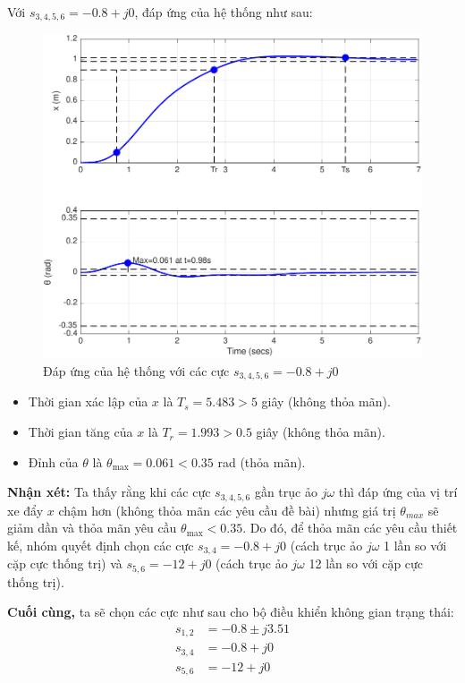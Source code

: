 \documentclass[12pt,a4paper]{article}
\begin{document}
\newpage

Với $s_{3,4,5,6}=-0.8+j0$, đáp ứng của hệ thống như sau:

\begin{figure}[ht]
    \centering
    \includegraphics[width=0.75\linewidth]{ss1.pdf}
    \caption{Đáp ứng của hệ thống với các cực $s_{3,4,5,6} = -0.8 +j0$}
\end{figure}

\begin{itemize}
    \item Thời gian xác lập của $x$ là $T_s = 5.483 > 5$ giây (không thỏa mãn).
    \item Thời gian tăng của $x$ là $T_r = 1.993 > 0.5$ giây (không thỏa mãn).
    \item Đỉnh của $\theta$ là $\theta_{\max} = 0.061 < 0.35$ rad (thỏa mãn).
\end{itemize}

\textbf{Nhận xét:} Ta thấy rằng khi các cực $s_{3,4,5,6}$ gần trục ảo $j\omega$ thì đáp ứng của vị trí xe đẩy $x$ chậm hơn (không thỏa mãn các yêu cầu đề bài) nhưng giá trị $\theta_{max}$ sẽ giảm dần và thỏa mãn yêu cầu $\theta_{\max} < 0.35$. Do đó, để thỏa mãn các yêu cầu thiết kế, nhóm quyết định chọn các cực $s_{3,4} = -0.8 +j0$ (cách trục ảo $j\omega$ 1 lần so với cặp cực thống trị) và $s_{5,6}=-12 + j0$ (cách trục ảo $j\omega$ 12 lần so với cặp cực thống trị).

\textbf{Cuối cùng,} ta sẽ chọn các cực như sau cho bộ điều khiển không gian trạng thái:
\begin{align*}
    s_{1,2} &= -0.8 \pm j3.51\\
    s_{3,4} &= -0.8 + j0\\
    s_{5,6} &= -12 + j0
\end{align*}
\end{document}
